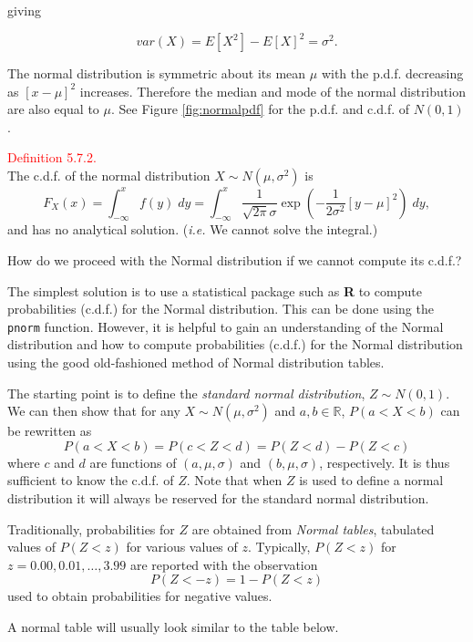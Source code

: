 \documentclass[
]{book}
\begin{document}
giving

\[ var (X) = E[X^2] - E[X]^2 = \sigma^2.\]

The normal distribution is symmetric about its mean \(\mu\) with the p.d.f. decreasing as \([x-\mu]^2\) increases. Therefore the median and mode of the normal distribution are also equal to \(\mu\). See Figure \ref{fig:normalpdf} for the p.d.f. and c.d.f. of \(N(0,1)\).

\leavevmode{}%
\textcolor{red}{Definition 5.7.2.}\\
The c.d.f. of the normal distribution \(X \sim N(\mu,\sigma^2)\) is
\[ F_X(x) = \int_{-\infty}^x f(y) \;dy = \int_{-\infty}^x \frac{1}{\sqrt{2 \pi} \sigma} \exp \left( - \frac{1}{2 \sigma^2} [y-\mu]^2 \right) \;dy, \]
and has no analytical solution. (\emph{i.e.} We cannot solve the integral.)

How do we proceed with the Normal distribution if we cannot compute its c.d.f.?

The simplest solution is to use a statistical package such as \textbf{R} to compute probabilities (c.d.f.) for the Normal distribution. This can be done using the \texttt{pnorm} function. However, it is helpful to gain an understanding of the Normal distribution and how to compute probabilities (c.d.f.) for the Normal distribution using the good old-fashioned method of Normal distribution tables.

The starting point is to define the \emph{standard normal distribution}, \(Z \sim N(0,1)\). We can then show that for any \(X \sim N(\mu,\sigma^2)\) and \(a, b \in \mathbb{R}\), \(P(a < X<b)\) can be rewritten as
\[ P(a <X <b) = P(c <Z<d) = P(Z<d) - P(Z<c)\]
where \(c\) and \(d\) are functions of \((a,\mu,\sigma)\) and \((b,\mu,\sigma)\), respectively. It is thus sufficient to know the c.d.f. of \(Z\). Note that when \(Z\) is used to define a normal distribution it will always be reserved for the standard normal distribution.

Traditionally, probabilities for \(Z\) are obtained from \emph{Normal tables}, tabulated values of \(P(Z<z)\) for various values of \(z\). Typically, \(P(Z <z)\) for \(z=0.00,0.01,\ldots,3.99\) are reported with the observation \[P(Z <-z) = 1-P(Z<z)\] used to obtain probabilities for negative values.

A normal table will usually look similar to the table below.
\end{document}
